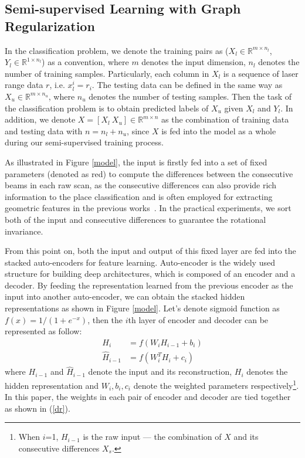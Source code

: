 \documentclass[letterpaper, 10 pt, conference]{ieeeconf}  %
\begin{document}
\subsection{Semi-supervised Learning with Graph Regularization}
In the classification problem, we denote the training  pairs as ($X_l\in\mathbb{R}^{m\times n_l}$, $Y_l\in\mathbb{R}^{1\times n_l}$) as a convention, where $m$ denotes the input dimension, $n_l$ denotes the number of training samples. Particularly, each column in $X_l$ is a sequence of laser range data $r$, i.e. $x_l^i=r_i$. The testing data can be defined in the same way as $X_u\in\mathbb{R}^{m\times n_u}$, where $n_u$ denotes the number of testing samples. Then the task of the classification problem is to obtain predicted labels of $X_u$ given $X_l$ and $Y_l$. In addition, we denote $X=[X_l~X_u]\in\mathbb{R}^{m\times n}$ as the combination of training data and testing data with $n=n_l+n_u$, since $X$ is fed into the model as a whole during our semi-supervised training process.




As illustrated in Figure \ref{model}, the input is firstly fed into a set of fixed parameters (denoted as red) to compute the differences between the consecutive beams in each raw scan, as the consecutive differences can also provide rich information to the place classification and is often employed for extracting geometric features in the previous works~\cite{mozos2005supervised,sousa2007real}. In the practical experiments, we sort both of the input and consecutive differences to guarantee the rotational invariance.

From this point on, both the input and output of this fixed layer are fed into the stacked auto-encoders for feature learning.  Auto-encoder is the widely used structure for building deep architectures, which is composed of an encoder and a decoder. By feeding the representation learned from the previous encoder as the input into another auto-encoder, we can obtain the stacked hidden representations as shown in Figure \ref{model}. Let's denote sigmoid function as $f(x)=1/(1+e^{-x})$, then the $i$th layer of encoder and decoder can be represented as follow:
\begin{equation}\label{dr}
\begin{split}
  H_i &= f(W_iH_{i-1}+b_i)\\
  \hat{H}_{i-1} &= f(W_i^TH_i+c_i)
\end{split}
\end{equation}
where $H_{i-1}$ and $\hat{H}_{i-1}$ denote the input and its reconstruction, $H_i$ denotes the hidden representation and $W_i,b_i,c_i$ denote the weighted parameters respectively\footnote{When $i$=1, $H_{i-1}$ is the raw input --- the combination of $X$ and its consecutive differences $X_s$.}. In this paper, the weights in each pair of encoder and decoder are tied together as shown in (\ref{dr}).
\end{document}
